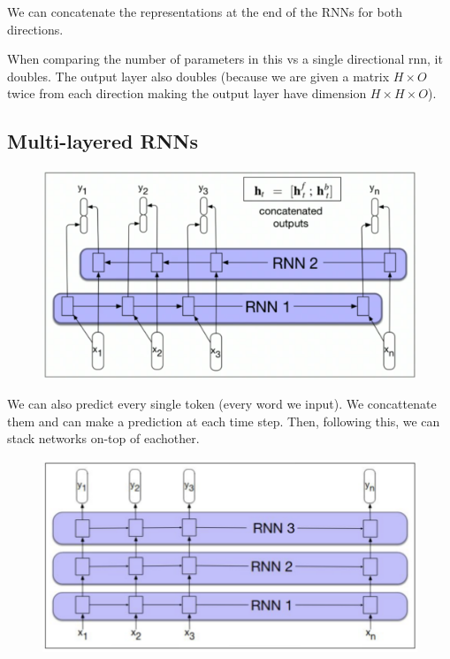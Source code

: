 \documentclass[11pt]{article}
\begin{document}
We can concatenate the representations at the end of the RNNs for both directions. 

When comparing the number of parameters in this vs a single directional rnn, it doubles. The output layer also doubles (because we are given a matrix $H\times O$ twice from each direction making the output layer have dimension $H\times H \times O$).

\subsection{Multi-layered RNNs}

\begin{figure}[H]
    \centering
    \includegraphics[width=\linewidth]{figures/rnn-bidirectional-not-single-output.png}
\end{figure}

We can also predict every single token (every word we input). We concattenate them and can make a prediction at each time step. Then, following this, we can stack networks on-top of eachother.

\begin{figure}[H]
    \centering
    \includegraphics[width=\linewidth]{figures/multi-layered-rnn.png}
\end{figure}
\end{document}
